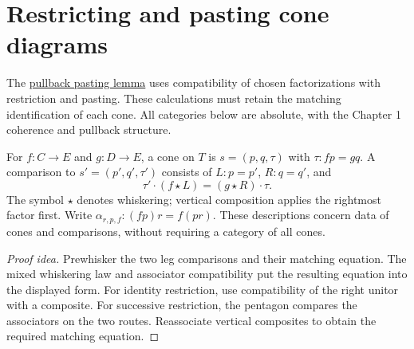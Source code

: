 \documentclass[11pt]{article}
\begin{document}
\section*{Restricting and pasting cone diagrams}

The \href{pullbacks.html\#lem:Pasting_Lemma_Pullbacks}{pullback pasting lemma}
uses compatibility of chosen factorizations with restriction and pasting.
These calculations must retain the matching identification of each cone.
All categories below are absolute, with the Chapter 1 coherence and
pullback structure.

For $f\colon C\to E$ and $g\colon D\to E$, a cone on $T$ is
$s=(p,q,\tau)$ with $\tau\colon fp=gq$.
A comparison to $s'=(p',q',\tau')$ consists of $L\colon p=p'$,
$R\colon q=q'$, and
\[
 \tau'\cdot(f\star L)=(g\star R)\cdot\tau.
\]
The symbol $\star$ denotes whiskering; vertical composition applies the
rightmost factor first. Write $\alpha_{r,p,f}\colon(fp)r=f(pr)$.
These descriptions concern data of cones and comparisons, without requiring
a category of all cones.

\begin{proof}[Proof idea]
Prewhisker the two leg comparisons and their matching equation.
The mixed whiskering law and associator compatibility put the resulting
equation into the displayed form. For identity restriction, use
compatibility of the right unitor with a composite. For successive
restriction, the pentagon compares the associators on the two routes.
Reassociate vertical composites to obtain the required matching equation.
\end{proof}
\end{document}
